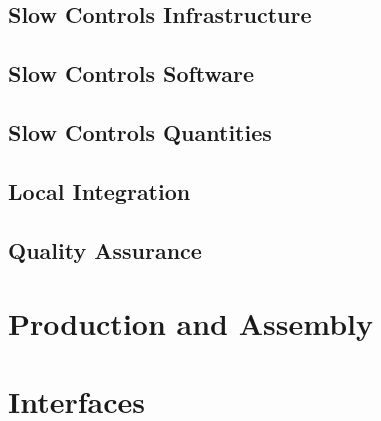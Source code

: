 \subsection{Slow Controls Infrastructure}
\label{sec:fddp-slow-cryo-slow-infra}

\subsection{Slow Controls Software}
\label{sec:fddp-slow-cryo-sw}

\subsection{Slow Controls Quantities}
\label{sec:fddp-slow-cryo-quant}

\subsection{Local Integration}
\label{sec:fddp-slow-cryo-slow-loc-integ}

\subsection{Quality Assurance}
\label{sec:fddp-slow-cryo-slow-qa}



\section{Production and Assembly}
\label{sec:fddp-slow-cryo-prod-assy}




\section{Interfaces}
\label{sec:fddp-slow-cryo-intfc}





